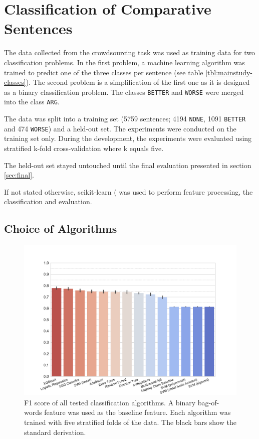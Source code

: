 \chapter{Classification of Comparative Sentences}
The data collected from the crowdsourcing task was used as training data for two classification problems. In the first problem, a machine learning algorithm was trained to predict one of the three classes per sentence (see table \ref{tbl:mainstudy-classes}). The second problem is a simplification of the first one as it is designed as a binary classification problem. The classes \texttt{BETTER} and \texttt{WORSE} were merged into the class \texttt{ARG}.

The data was split into a training set (5759 sentences; 4194 \texttt{NONE}, 1091 \texttt{BETTER} and 474 \texttt{WORSE}) and a held-out set.
The experiments were conducted on the training set only. During the development, the experiments were evaluated using stratified k-fold cross-validation where k equals five. 

The held-out set stayed untouched until the final evaluation presented in section \ref{sec:final}.

If not stated otherwise, scikit-learn (\cite{scikit-learn} was used to perform feature processing, the classification and evaluation.

\section{Choice of Algorithms}

\begin{figure}[htb]
\centering
\caption{F1 score of all tested classification algorithms. A binary bag-of-words feature was used as the baseline feature. Each algorithm was trained with five stratified folds of the data. The black bars show the standard derivation.}
\label{tbl:algo}
\includegraphics[width=0.8\linewidth]{images/classifier}
\end{figure}

